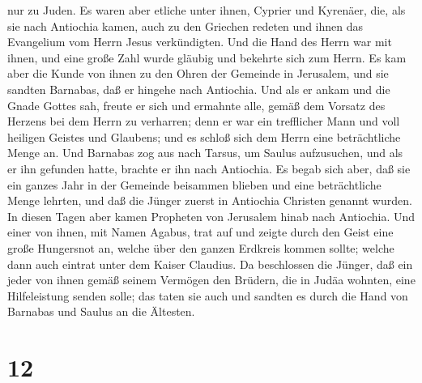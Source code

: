 nur zu Juden.  Es waren aber etliche unter ihnen, Cyprier
und Kyrenäer, die, als sie nach Antiochia kamen, auch zu den Griechen
redeten und ihnen das Evangelium vom Herrn Jesus verkündigten.
 Und die Hand des Herrn war mit ihnen, und eine große
Zahl wurde gläubig und bekehrte sich zum Herrn.  Es kam
aber die Kunde von ihnen zu den Ohren der Gemeinde in Jerusalem, und sie
sandten Barnabas, daß er hingehe nach Antiochia.  Und als
er ankam und die Gnade Gottes sah, freute er sich und ermahnte alle,
gemäß dem Vorsatz des Herzens bei dem Herrn zu verharren;
 denn er war ein trefflicher Mann und voll heiligen
Geistes und Glaubens; und es schloß sich dem Herrn eine beträchtliche
Menge an.  Und Barnabas zog aus nach Tarsus, um Saulus
aufzusuchen, und als er ihn gefunden hatte, brachte er ihn nach
Antiochia.  Es begab sich aber, daß sie ein ganzes Jahr
in der Gemeinde beisammen blieben und eine beträchtliche Menge lehrten,
und daß die Jünger zuerst in Antiochia Christen genannt wurden.
 In diesen Tagen aber kamen Propheten von Jerusalem hinab
nach Antiochia.  Und einer von ihnen, mit Namen Agabus,
trat auf und zeigte durch den Geist eine große Hungersnot an, welche
über den ganzen Erdkreis kommen sollte; welche dann auch eintrat unter
dem Kaiser Claudius.  Da beschlossen die Jünger, daß ein
jeder von ihnen gemäß seinem Vermögen den Brüdern, die in Judäa wohnten,
eine Hilfeleistung senden solle;  das taten sie auch und
sandten es durch die Hand von Barnabas und Saulus an die Ältesten.

\hypertarget{section-11}{%
\section{12}\label{section-11}}

